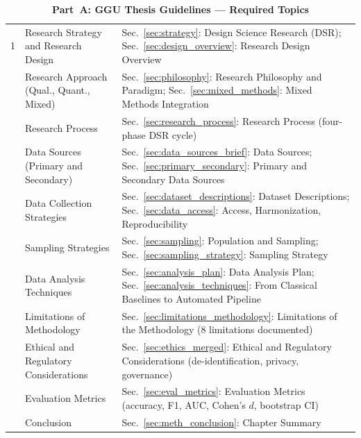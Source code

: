 \begin{table}[!htbp]
\caption{Appendix Ch3 Ggu Checklist Table 1}
\tablestripes
\caption*{\textbf{Part~A: GGU Thesis Guidelines --- Required Topics}}
\tablefontsize
\begin{tabularx}{\textwidth}{@{} p{0.4cm} L L @{}}
\toprule
\thead{\#} &  &  \\
 & Research Strategy and Research Design & Sec.~\ref{sec:strategy}: Design Science Research (DSR); Sec.~\ref{sec:design_overview}: Research Design Overview \\
 & Research Approach (Qual., Quant., Mixed) & Sec.~\ref{sec:philosophy}: Research Philosophy and Paradigm; Sec.~\ref{sec:mixed_methods}: Mixed Methods Integration \\
 & Research Process & Sec.~\ref{sec:research_process}: Research Process (four-phase DSR cycle) \\
 & Data Sources (Primary and Secondary) & Sec.~\ref{sec:data_sources_brief}: Data Sources; Sec.~\ref{sec:primary_secondary}: Primary and Secondary Data Sources \\
 & Data Collection Strategies & Sec.~\ref{sec:dataset_descriptions}: Dataset Descriptions; Sec.~\ref{sec:data_access}: Access, Harmonization, Reproducibility \\
 & Sampling Strategies & Sec.~\ref{sec:sampling}: Population and Sampling; Sec.~\ref{sec:sampling_strategy}: Sampling Strategy \\
 & Data Analysis Techniques & Sec.~\ref{sec:analysis_plan}: Data Analysis Plan; Sec.~\ref{sec:analysis_techniques}: From Classical Baselines to Automated Pipeline \\
 & Limitations of Methodology & Sec.~\ref{sec:limitations_methodology}: Limitations of the Methodology (8 limitations documented) \\
 & Ethical and Regulatory Considerations & Sec.~\ref{sec:ethics_merged}: Ethical and Regulatory Considerations (de-identification, privacy, governance) \\
 & Evaluation Metrics & Sec.~\ref{sec:eval_metrics}: Evaluation Metrics (accuracy, F1, AUC, Cohen's $d$, bootstrap CI) \\
 & Conclusion & Sec.~\ref{sec:meth_conclusion}: Chapter Summary \\
\bottomrule
\end{tabularx}
\end{table}

